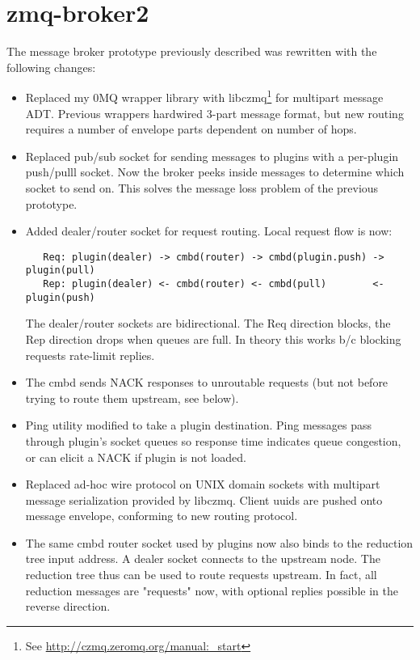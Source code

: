 \section{zmq-broker2}

The message broker prototype previously described was rewritten with
the following changes:
\begin{itemize}
\item{Replaced my 0MQ wrapper library with libczmq\footnote{See
  \url{http://czmq.zeromq.org/manual:_start}}}
  for multipart message ADT.
  Previous wrappers hardwired 3-part message format, but new routing
  requires a number of envelope parts dependent on number of hops.

\item{Replaced pub/sub socket for sending messages to plugins with a per-plugin
  push/pulll socket.  Now the broker peeks inside messages to determine
  which socket to send on.  This solves the message loss problem of the
  previous prototype.}

\item{Added dealer/router socket for request routing. Local request flow is now:
\begin{verbatim}
   Req: plugin(dealer) -> cmbd(router) -> cmbd(plugin.push) -> plugin(pull)
   Rep: plugin(dealer) <- cmbd(router) <- cmbd(pull)        <- plugin(push)
\end{verbatim}
  The dealer/router sockets are bidirectional.  The Req direction blocks,
  the Rep direction drops when queues are full.  In theory this works b/c
  blocking requests rate-limit replies.}

\item{The cmbd sends NACK responses to unroutable requests
  (but not before trying to route them upstream, see below).}

\item{Ping utility modified to take a plugin destination.  Ping messages pass
  through plugin's socket queues so response time indicates queue congestion,
  or can elicit a NACK if plugin is not loaded.}

\item{Replaced ad-hoc wire protocol on UNIX domain sockets with multipart message
  serialization provided by libczmq.  Client uuids are pushed onto message
  envelope, conforming to new routing protocol.}

\item{The same cmbd router socket used by plugins now also binds to the
  reduction tree input address.  A dealer socket connects to the upstream
  node.  The reduction tree thus can be used to route requests upstream.
  In fact, all reduction messages are "requests" now, with optional replies
  possible in the reverse direction.}


\end{itemize}

